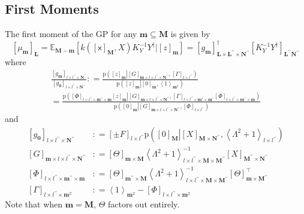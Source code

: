 \documentclass[preprint,12pt]{elsarticle}
\newcommand*{\M}[1]{\ensuremath{#1}\xspace}
\newcommand*{\x}{\times}
\newcommand*{\mi}[1]{\mathbf{#1}}
\newcommand*{\rv}[1]{\mathsf{#1}}
\newcommand*{\te}[2][]{\left\lbrack{#2}\right\rbrack_{#1}}
\newcommand*{\diag}[2][]{\left\langle{#2}\right\rangle_{#1}}
\newcommand*{\prob}[3]{\M{\mathrm{p}\!\left(\left.{#1}\right\vert{#2,#3}\right)}}
\newcommand*{\deq}{\M{\mathrel{\mathop:}=}}
\newcommand*{\ev}[3][]{\mathbb{E}_{#3}^{#1}\!\left\lbrack{#2}\right\rbrack}
\begin{document}
    \subsection{First Moments} \label{sub:GPMom:First}
        The first moment of the GP for any $\mi{m}\subseteq\mi{M}$ is given by
        \begin{equation*}
            \te[\mi{L}]{\mu_{\mi{m}}}
            = \ev{k\!\left(\te[\mi{M}]{\rv{x}},X\right) K_{Y}^{-1} Y^{\dagger} \big\vert \te[\mi{m}]{z}}{\mi{M-m}}
            = \te[\mi{L}\x\mi{L^{\prime\prime}}\x\mi{N^{\prime\prime}}]{g_{\mi{m}}}^{\dagger}
            \te[\mi{L^{\prime\prime}N^{\prime\prime}}]{K_{Y}^{-1} Y^{\dagger}}
        \end{equation*}
        where
        \begin{multline*}
            \frac{\te[l\x l^{\prime\prime}\x\mi{N^{\prime\prime}}]{g_{\mi{m}}}}{\te[l\x l^{\prime\prime}\x\mi{N^{\prime\prime}}]{g_{\mi{0}}}} \deq \frac
            {\prob{\te[\mi{m}]{z}}{\te[\mi{m}\x l\x l^{\prime\prime}\x\mi{N^{\prime\prime}}]{G}}{\te[l\x l^{\prime\prime}]{\Gamma}}}
            {\prob{\te[\mi{m}]{z}}{\te[\mi{m}]{0}}{\diag[\mi{m}^{2}]{1}}} \\
            = \frac{{\prob{\te[l\x l^{\prime\prime}\x\mi{m^{\prime\prime}\x m}]{\Phi}\te[\mi{m}]{z}}{\te[\mi{m}\x l\x l^{\prime\prime}\x\mi{N^{\prime\prime}}]{G}}{\te[l\x l^{\prime\prime}\x\mi{m^{*}\x m^{\prime\prime}}]{\Gamma}\te[l\x l^{\prime\prime}\x \mi{m^{\prime\prime}\x m}]{\Phi}}}}
            {\prob{\te[\mi{m}]{0}}{\te[\mi{m}\x l\x l^{\prime\prime}\x\mi{N^{\prime\prime}}]{G}}
            {\te[l\x l^{\prime\prime}]{\Phi}}}
        \end{multline*}
        and
        \begin{equation*}
            \begin{aligned}
                \te[l\x l^{\prime\prime}\x\mi{N^{\prime\prime}}]{g_{\mi{0}}} 
                &\deq \te[l\x l^{\prime\prime}]{\pm F}
                \prob{\te[\mi{M}]{0}}{\te[\mi{M}\x\mi{N^{\prime\prime}}]{X}}
                {\diag[l\x l^{\prime\prime}]{\Lambda^{2}+1}} \\
                \te[\mi{m}\x l\x l^{\prime\prime}\x\mi{N^{\prime\prime}}]{G} &\deq 
                \te[\mi{m}\x\mi{M}]{\Theta} \diag[l\x l^{\prime\prime}\x\mi{M}\x\mi{M^{\prime\prime}}]{\Lambda^{2}+1}^{-1} \te[\mi{M^{\prime\prime}}\x\mi{N^{\prime\prime}}]{X} \\
                \te[l\x l^{\prime\prime}\x\mi{m^{\prime\prime}}\x\mi{m}]{\Phi} &\deq 
                \te[\mi{m^{\prime\prime}}\x\mi{M}]{\Theta}
                \diag[l\x l^{\prime\prime}\x\mi{M}\x\mi{M^{\prime\prime}}]{\Lambda^{2}+1}^{-1} \te[\mi{m}\x\mi{M^{\prime\prime}}]{\Theta}^{\intercal} \\
                \te[l\x l^{\prime\prime}\x\mi{m}^{2}]{\Gamma} &\deq 
                \diag[\mi{m}^{2}]{1} -
                \te[l\x l^{\prime\prime}\x\mi{m}^{2}]{\Phi}
            \end{aligned}
        \end{equation*}
        Note that when $\mi{m} = \mi{M}$, $\Theta$ factors out entirely.
\end{document}
